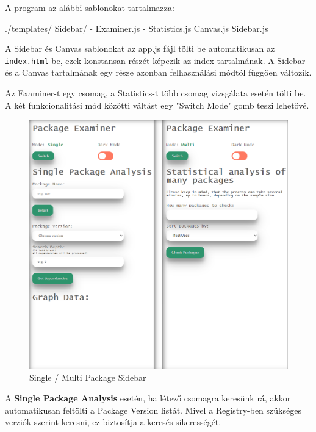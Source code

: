 A program az alábbi sablonokat tartalmazza:
\begin{js}
./templates/	
  Sidebar/
    - Examiner.js
    - Statistics.js
  Canvas.js
  Sidebar.js
\end{js}

A Sidebar és Canvas sablonokat az app.js fájl tölti be automatikusan az \newline\texttt{index.html}-be, ezek konstansan részét képezik az index tartalmának. A Sidebar és a Canvas tartalmának egy része azonban felhasználási módtól függően változik.

Az Examiner-t egy csomag, a Statistics-t több csomag vizsgálata esetén tölti be. A két funkcionalitási mód közötti váltást egy "Switch Mode" gomb teszi lehetővé.\\

\begin{figure}[!h]
	\centering
	\includegraphics[scale=0.2]{images/ui_modes.png}
	\caption{Single / Multi Package Sidebar}
	\label{fig:ui_modes}
\end{figure}

\pagebreak


A \textbf{Single Package Analysis} esetén, ha létező csomagra keresünk rá, akkor automatikusan feltölti a Package Version listát. Mivel a Registry-ben szükséges verziók szerint keresni, ez biztosítja a keresés sikerességét.\\

